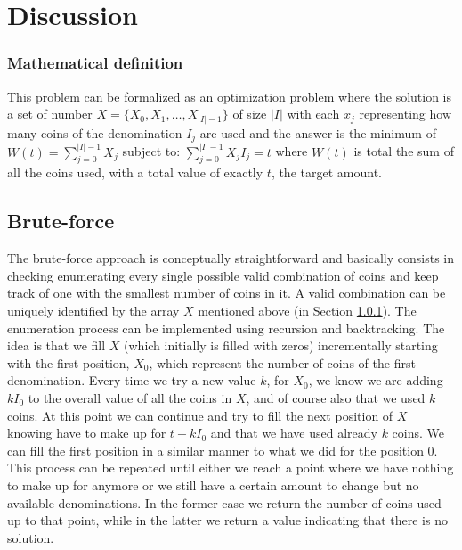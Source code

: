 \section{Discussion}
\label{coin_change:sec:discussion}

\subsubsection{Mathematical definition}
\label{coin_change:sec:mathdefinition}
This problem can be formalized as an optimization problem where the solution is a set of number $X=\{X_0,X_1,\ldots, X_{|I|-1}\}$ of size $|I|$ with each $x_j$ representing how many coins of the denomination $I_j$ are used and the answer is the minimum of 
$
	W(t) = \sum_{j=0}^{|I|-1} X_j
$
subject to:
$
	\sum_{j=0}^{|I|-1} X_j I_j = t
$
where $W(t)$ is total the sum of all the coins used, with a total value of exactly $t$, the target amount.

\subsection{Brute-force}
\label{coin_change:sec:bruteforce}
The brute-force approach is conceptually straightforward and basically consists in checking enumerating every single possible valid combination of coins
and keep track of one with the smallest number of coins in it. A valid combination can be uniquely identified by the array $X$  mentioned above (in Section \ref{coin_change:sec:mathdefinition}).
The enumeration process can be implemented using recursion and backtracking. 
The idea is that we fill $X$ (which initially is filled with zeros) incrementally starting with the first position, $X_0$, which represent the number of coins of the first denomination. 
Every time we try a new value $k$, for $X_0$, we know we are adding $kI_0$ to the overall value of all the coins in $X$, and of course also that we used $k$ coins.
At this point we can continue and try to fill the next position of $X$ knowing have to make up for $t-kI_0$ and that we have used already $k$ coins. We can fill the first position in a similar manner to what we did for the position $0$.
This process can be repeated until either we reach a point where we have nothing to make up for anymore or we still have a certain amount to change but no available denominations.
In the former case we return the number of coins used up to that point, while in the latter we return a value indicating that there is no solution.

